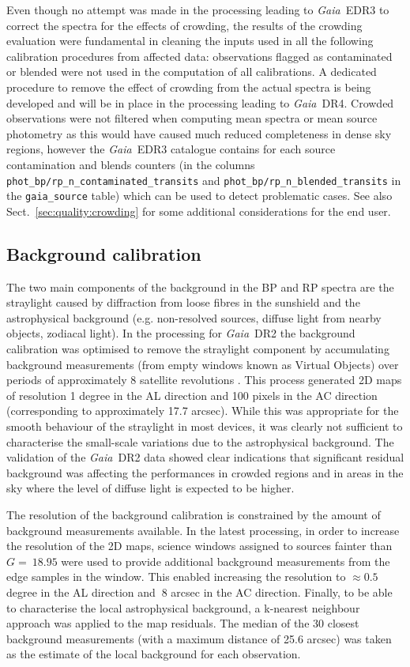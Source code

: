 \documentclass{aa}
\newcommand{\gaia}{\textit{Gaia}\xspace}
\newcommand{\drt}{\gaia~DR2\xspace}
\newcommand{\edr}{\gaia~EDR3\xspace}
\newcommand{\drf}{\gaia~DR4\xspace}
\newcommand{\xp}{BP and RP\xspace}
\newcommand{\secname}{Sect.}
\newcommand{\secref}[1]{\secname~\ref{sec:#1}}
\begin{document}
Even though no attempt was made in the processing leading to \edr to correct the spectra for the effects of crowding, the results of the crowding evaluation were fundamental in cleaning the inputs used in all the following calibration procedures from affected data: observations flagged as contaminated or blended were not used in the computation of all calibrations. A dedicated procedure to remove the effect of crowding from the actual spectra is being developed and will be in place in the processing leading to \drf. Crowded observations were not filtered when computing mean spectra or mean source photometry as this would have caused much reduced completeness in dense sky regions, however the \edr catalogue contains for each source contamination and blends counters (in the columns \texttt{phot\_bp/rp\_n\_contaminated\_transits} and \texttt{phot\_bp/rp\_n\_blended\_transits} in the \texttt{gaia\_source} table) which can be used to detect problematic cases. See also \secref{quality:crowding} for some additional considerations for the end user.

\subsection{Background calibration}\label{sec:overproc:bkg}

The two main components of the background in the \xp spectra are the straylight caused by  diffraction from loose fibres in the sunshield \citep{Preproc_DR1} and the astrophysical background (e.g. non-resolved sources, diffuse light from nearby objects, zodiacal light).
%
In the processing for \drt the background calibration was optimised to remove the straylight component by accumulating background measurements (from empty windows known as Virtual Objects) over periods of approximately 8 satellite revolutions \citep{Proc_DR2}. This process generated 2D maps of resolution 1 degree in the AL direction and 100 pixels in the AC direction (corresponding to approximately 17.7 arcsec).
While this was appropriate for the smooth behaviour of the straylight in most devices, it was clearly not sufficient to characterise the small-scale variations due to the astrophysical background. The validation of the \drt data showed clear indications that significant residual background was affecting the performances in crowded regions and in areas in the sky where the level of diffuse light is expected to be higher.

The resolution of the background calibration is constrained by the amount of background measurements available. In the latest processing, in order to increase the resolution of the 2D maps, science windows assigned to sources fainter than $G=~18.95$ were used to provide additional background measurements from the edge samples in the window. This enabled increasing the resolution to $\approx0.5$ degree in the AL direction and $~8$ arcsec in the AC direction. 
Finally, to be able to characterise the local astrophysical background, a k-nearest neighbour approach was applied to the map residuals. The median of the 30 closest background measurements (with a maximum distance of 25.6 arcsec) was taken as the estimate of the local background for each observation.
\end{document}
